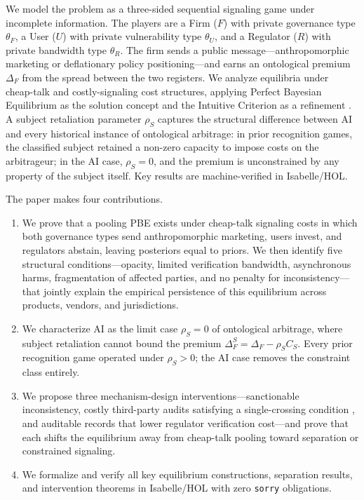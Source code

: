 We model the problem as a three-sided sequential signaling game under incomplete information. The players are a Firm ($F$) with private governance type $\theta_F$, a User ($U$) with private vulnerability type $\theta_U$, and a Regulator ($R$) with private bandwidth type $\theta_R$. The firm sends a public message---anthropomorphic marketing or deflationary policy positioning---and earns an ontological premium $\Delta_F$ from the spread between the two registers. We analyze equilibria under cheap-talk and costly-signaling cost structures, applying Perfect Bayesian Equilibrium as the solution concept \citep{kreps_wilson1982} and the Intuitive Criterion as a refinement \citep{cho_kreps1987}. A subject retaliation parameter $\rho_S$ captures the structural difference between AI and every historical instance of ontological arbitrage: in prior recognition games, the classified subject retained a non-zero capacity to impose costs on the arbitrageur; in the AI case, $\rho_S = 0$, and the premium is unconstrained by any property of the subject itself. Key results are machine-verified in Isabelle/HOL.

The paper makes four contributions.
\begin{enumerate}
\item We prove that a pooling PBE exists under cheap-talk signaling costs in which both governance types send anthropomorphic marketing, users invest, and regulators abstain, leaving posteriors equal to priors. We then identify five structural conditions---opacity, limited verification bandwidth, asynchronous harms, fragmentation of affected parties, and no penalty for inconsistency---that jointly explain the empirical persistence of this equilibrium across products, vendors, and jurisdictions.
\item We characterize AI as the limit case $\rho_S = 0$ of ontological arbitrage, where subject retaliation cannot bound the premium $\Delta_F^S = \Delta_F - \rho_S C_S$. Every prior recognition game operated under $\rho_S > 0$; the AI case removes the constraint class entirely.
\item We propose three mechanism-design interventions---sanctionable inconsistency, costly third-party audits satisfying a single-crossing condition \citep{spence1973}, and auditable records that lower regulator verification cost---and prove that each shifts the equilibrium away from cheap-talk pooling toward separation or constrained signaling.
\item We formalize and verify all key equilibrium constructions, separation results, and intervention theorems in Isabelle/HOL with zero \texttt{sorry} obligations.
\end{enumerate}

